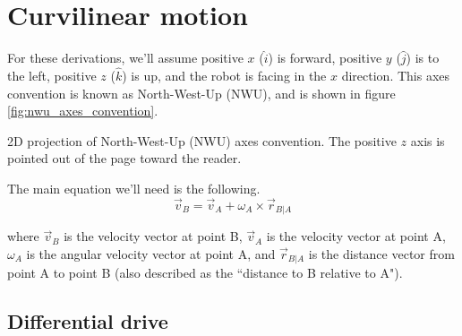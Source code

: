 \section{Curvilinear motion}

For these derivations, we'll assume positive $x$ ($\hat{i}$) is forward,
positive $y$ ($\hat{j}$) is to the left, positive $z$ ($\hat{k}$) is up, and
the robot is facing in the $x$ direction. This axes convention is known as
North-West-Up (NWU), and is shown in figure \ref{fig:nwu_axes_convention}.
\begin{bookfigure}

  \caption{2D projection of North-West-Up (NWU) axes convention. The positive
    $z$ axis is pointed out of the page toward the reader.}
  \label{fig:nwu_axes_convention}
\end{bookfigure}

The main equation we'll need is the following.
\begin{equation*}
  \vec{v}_B = \vec{v}_A + \omega_A \times \vec{r}_{B|A}
\end{equation*}

where $\vec{v}_B$ is the velocity vector at point B, $\vec{v}_A$ is the velocity
vector at point A, $\omega_A$ is the angular velocity vector at point A, and
$\vec{r}_{B|A}$ is the distance vector from point A to point B (also described
as the ``distance to B relative to A").

\subsection{Differential drive}

